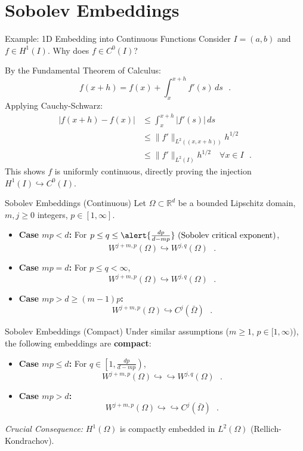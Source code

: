\documentclass[aspectratio=169]{beamer}
\begin{document}
\section{Sobolev Embeddings}

\begin{frame}{Example: 1D Embedding into Continuous Functions}
    Consider $I = (a, b)$ and $f \in H^1(I)$. Why does $f \in C^0(I)$?  \pause
    
    By the Fundamental Theorem of Calculus:
    \[
        f(x+h) = f(x) + \int_x^{x+h} f'(s) \, ds \text{ }.
    \]
    Applying Cauchy-Schwarz:
    \begin{align*}
        |f(x+h) - f(x)| &\le \int_x^{x+h} |f'(s)| \, ds \text{ } \\
        &\le \|f'\|_{L^2((x, x+h))} h^{1/2} \text{ } \\
        &\le \|f'\|_{L^2(I)} h^{1/2} \quad \forall x \in I \text{ }.
    \end{align*}
    This shows $f$ is uniformly continuous, directly proving the injection $H^1(I) \hookrightarrow C^0(I)$.
\end{frame}


\begin{frame}{Sobolev Embeddings (Continuous)}
    Let $\Omega \subset \mathbb{R}^d$ be a bounded Lipschitz domain, $m, j \ge 0$ integers, $p \in [1, \infty]$.
    
    \begin{itemize}
        \item \textbf{Case $mp < d$:} For $p \le q \le \alert{\frac{dp}{d-mp}} \text{ (Sobolev critical exponent)} $,
        \[
            W^{j+m,p}(\Omega) \hookrightarrow W^{j,q}(\Omega) \text{ }.
        \]
        \item \textbf{Case $mp = d$:} For $p \le q < \infty$,
        \[
            W^{j+m,p}(\Omega) \hookrightarrow W^{j,q}(\Omega) \text{ }.
        \]
        \item \textbf{Case $mp > d \ge (m-1)p$:}
        \[
            W^{j+m,p}(\Omega) \hookrightarrow C^j(\bar{\Omega}) \text{ }.
        \]
    \end{itemize}
\end{frame}

\begin{frame}{Sobolev Embeddings (Compact)}
    Under similar assumptions ($m \ge 1$, $p \in [1, \infty)$), the following embeddings are \textbf{compact}:
    
    \begin{itemize}
        \item \textbf{Case $mp \le d$:} For $q \in \left[1, \frac{dp}{d-mp}\right)$,
        \[
            W^{j+m,p}(\Omega) \hookrightarrow \hookrightarrow W^{j,q}(\Omega) \text{ }.
        \]
        \item \textbf{Case $mp > d$:}
        \[
            W^{j+m,p}(\Omega) \hookrightarrow \hookrightarrow C^j(\bar{\Omega}) \text{ }.
        \]
    \end{itemize}
    
    \vspace{0.3cm}
    \textit{Crucial Consequence:} $H^1(\Omega)$ is compactly embedded in $L^2(\Omega)$ (Rellich-Kondrachov).
\end{frame}


\begin{frame}
    \maketitle
\end{frame}
\end{document}
